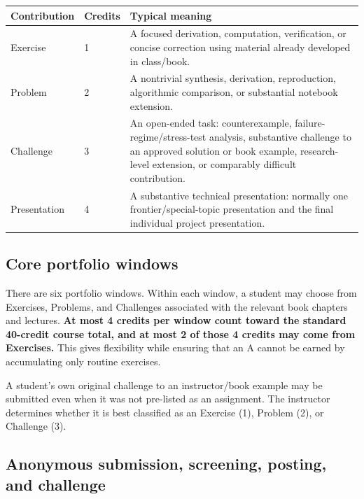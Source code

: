 \documentclass[11pt]{article}
\begin{document}
\begin{center}
\begin{tabular}{p{} p{} p{}}
\toprule
\textbf{Contribution} & \textbf{Credits} & \textbf{Typical meaning}\\
\midrule
Exercise & 1 & A focused derivation, computation, verification, or concise correction using material already developed in class/book.\\
Problem & 2 & A nontrivial synthesis, derivation, reproduction, algorithmic comparison, or substantial notebook extension.\\
Challenge & 3 & An open-ended task: counterexample, failure-regime/stress-test analysis, substantive challenge to an approved solution or book example, research-level extension, or comparably difficult contribution.\\
Presentation & 4 & A substantive technical presentation: normally one frontier/special-topic presentation and the final individual project presentation.\\
\bottomrule
\end{tabular}
\end{center}

\subsection*{Core portfolio windows}

There are six portfolio windows. Within each window, a student may choose from Exercises, Problems, and Challenges associated with the relevant book chapters and lectures. \textbf{At most 4 credits per window count toward the standard 40-credit course total, and at most 2 of those 4 credits may come from Exercises.} This gives flexibility while ensuring that an A cannot be earned by accumulating only routine exercises.

A student's own original challenge to an instructor/book example may be submitted even when it was not pre-listed as an assignment. The instructor determines whether it is best classified as an Exercise (1), Problem (2), or Challenge (3).

\subsection*{Anonymous submission, screening, posting, and challenge}
\end{document}
